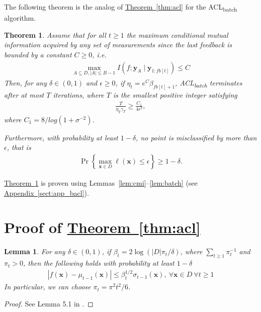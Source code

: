 \documentclass{article}
\def\*#1{\bm{#1}}
\newcommand{\theoremref}[1]{\hyperref[#1]{\mbox{Theorem~\ref*{#1}}}}
\newcommand{\appref}[1]{\hyperref[#1]{\mbox{Appendix~\ref*{#1}}}}
\newtheorem{theorem}{Theorem}
\newtheorem{lemma}{Lemma}
\newcommand{\bacl}{\textsf{ACL\textsubscript{batch}}\xspace}
\begin{document}
The following theorem is the analog of \theoremref{thm:acl} for the
\bacl algorithm.

\begin{theorem}
\label{thm:bacl}
Assume that for all $t \geq 1$ the maximum conditional mutual information
acquired by any set of measurements since the last feedback is bounded
by a constant $C \geq 0$, i.e.
\begin{align*}
\max_{A\subseteq D, |A|\leq B-1} I(f; \*y_A \mid \*y_{1:fb[t]}) \leq C
\end{align*}
Then, for any $\delta \in (0, 1)$ and $\epsilon \geq 0$,
if $\eta_t = e^C\beta_{fb[t]+1}$, \bacl terminates after
at most $T$ iterations, where $T$ is the smallest positive integer
satisfying
\begin{align*}
\frac{T}{\eta_T \gamma_T} \geq \frac{C_1}{4\epsilon^2},
\end{align*}
where $C_1 = 8/log(1 + \sigma^{-2})$.

Furthermore, with probability at least $1-\delta$, no point is
misclassified by more than $\epsilon$, that is
\begin{align*}
\Pr\left\{\max_{\*x\in D}\ell(\*x) \leq \epsilon\right\} \geq 1 - \delta.
\end{align*}
\end{theorem}

\theoremref{thm:bacl} is proven using
Lemmas~\ref{lem:cmi}--\ref{lem:batch}  (see \appref{sect:app_bacl}).





\appendix
\section{Proof of \theoremref{thm:acl}} \label{sect:app_acl}

\begin{lemma}
\label{lem:srin1}
For any $\delta \in (0, 1)$, if $\beta_t = 2\log(|D|\pi_t/\delta)$, where
$\sum_{t\geq1}\pi_t^{-1}$ and $\pi_t > 0$, then the following holds with
probability at least $1-\delta$
\begin{align*}
|f(\*x) - \mu_{t-1}(\*x)| \leq \beta_t^{1/2}\sigma_{t-1}(\*x),\ \forall \*x \in D\ \forall t \geq 1
\end{align*}
In particular, we can choose $\pi_t = \pi^2 t^2/6$.
\end{lemma}
\begin{proof}
See Lemma 5.1 in \cite{srinivas2010}.
\end{proof}
\end{document}
